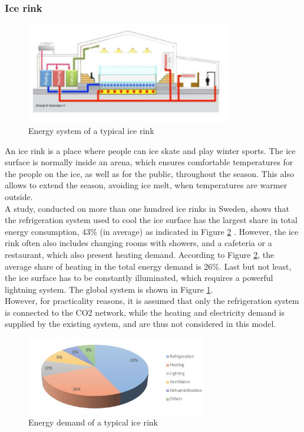 \documentclass{article}
\begin{document}
\subsubsection{Ice rink}

\begin{figure}[htp]
	\centering
	\includegraphics[width=0.8\textwidth]{IR_schema.JPG}
	\caption{Energy system of a typical ice rink \cite{gronqvistComparativeLifecycleCost}}
	\label{fig:IR_schema}
\end{figure}

An ice rink is a place where people can ice skate and play winter sports. The ice surface is normally inside an arena, which ensures comfortable temperatures for the people on the ice, as well as for the public, throughout the season. This also allows to extend the season, avoiding ice melt, when temperatures are warmer outside.\\

A study, conducted on more than one hundred ice rinks in Sweden, shows that the refrigeration system used to cool the ice surface has the largest share in total energy consumption, 43\% (in average) as indicated in Figure \ref{fig:IR_energyDemand} \cite{karampourMEASUREMENTMODELLINGICE}. 
However, the ice rink often also includes changing rooms with showers, and a cafeteria or a restaurant, which also present heating demand. According to Figure \ref{fig:IR_energyDemand}, the average share of heating in the total energy demand is 26\%.
Last but not least, the ice surface has to be constantly illuminated, which requires a powerful lightning system. The global system is shown in Figure \ref{fig:IR_schema}.\\

However, for practicality reasons, it is assumed that only the refrigeration system is connected to the CO2 network, while the heating and electricity demand is supplied by the existing system, and are thus not considered in this model.

\begin{figure}[htp]
	\centering
	\includegraphics[width=0.7\textwidth]{IR_energyDemand.JPG}
	\caption{Energy demand of a typical ice rink \cite{karampourMEASUREMENTMODELLINGICE}}
	\label{fig:IR_energyDemand}
\end{figure}
\end{document}
